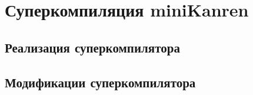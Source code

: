 \section{Суперкомпиляция miniKanren}

\subsection{Реализация суперкомпилятора}



\subsection{Модификации суперкомпилятора}



